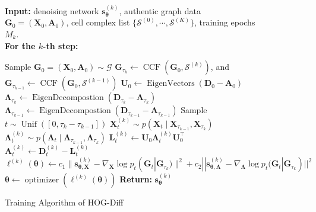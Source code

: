 \begin{figure}[t!]
\centering
\begin{minipage}{\linewidth}
\centering
\begin{algorithm}[H]
\small
\caption{ Training Algorithm of HOG-Diff }
    \textbf{Input:} denoising network $\bm{s}_{\bm{\theta}}^{(k)}$,
                    authentic graph data $\bm{G}_0=(\bm{X}_0, \bm{A}_0)$, 
                    cell complex list $\{\mathcal{S}^{(0)},\cdots,\mathcal{S}^{(K)}\}$, 
                    \phantom{-} training epochs $M_k$.\\
    \textbf{For the $k$-th step:} \phantom{-}             
\begin{algorithmic}[1]
    \STATE Sample $\bm{G}_0=(\bm{X}_0,\bm{A}_0) \sim \mathcal{G}$
    \STATE $\bm{G}_{\tau_k} \leftarrow \operatorname{CCF}(\bm{G}_0, \mathcal{S}^{(k)})$, and $\bm{G}_{\tau_{k-1}} \leftarrow \operatorname{CCF}(\bm{G}_0, \mathcal{S}^{(k-1)})$ 
    \STATE $\bm{U}_0 \leftarrow \operatorname{EigenVectors}(\bm{D}_0 - \bm{A}_0)$
    \STATE $\bm{\Lambda}_{\tau_k} \leftarrow \operatorname{EigenDecompostion}(\bm{D}_{\tau_k} - \bm{A}_{\tau_k})$
    \STATE $\bm{\Lambda}_{\tau_{k-1}} \leftarrow \operatorname{EigenDecompostion}(\bm{D}_{\tau_{k-1}} - \bm{A}_{\tau_{k-1}})$
    \STATE Sample $t \sim \operatorname{Unif}([0,\tau_k - \tau_{k-1}])$
    \STATE $\bm{X}_t^{(k)} \sim p(\bm{X}_t \mid \bm{X}_{\tau_{k-1}},\bm{X}_{\tau_{k}})$ 
    \STATE $\bm{\Lambda}_t^{(k)} \sim p(\bm{\Lambda}_t \mid \bm{\Lambda}_{\tau_{k-1}},\bm{\Lambda}_{\tau_{k}})$ 
    \STATE $\bm{L}_t^{(k)} \leftarrow \bm{U}_0 \bm{\Lambda}_t^{(k)} \bm{U}_0^\top$
    \STATE $\bm{A}_t^{(k)} \leftarrow \bm{D}_t^{(k)} - \bm{L}_t^{(k)}  $
    \STATE $\ell^{(k)}(\bm{\theta}) \leftarrow c_1\|
\bm{s}^{(k)}_{\bm{\theta},\bm{X}} - \nabla_{\bm{X}} \log p_t(\bm{G}_t | \bm{G}_{\tau_k})\|^2 \nonumber + c_2 ||\bm{s}^{(k)}_{\bm{\theta},\bm{\Lambda}} - \nabla_{\bm{\Lambda}} \log p_t(\bm{G}_t |\bm{G}_{\tau_k})||^2$
    \STATE $\bm{\theta} \leftarrow \operatorname{optimizer}(\ell^{(k)}(\bm{\theta}))$ 
\ENDFOR
\STATE \textbf{Return:} $\bm{s}^{(k)}_{\bm{\theta}}$
\end{algorithmic}
\label{alg:train}
\end{algorithm}
\end{minipage}
\vspace{-0.2in}
\end{figure}
